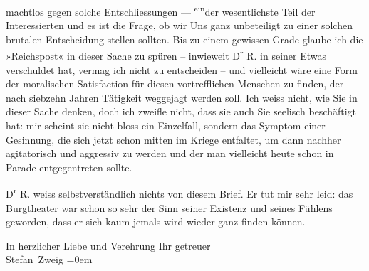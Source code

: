                machtlos gegen solche Entschliessungen — \substVorne{}\textsuperscript{ein}\substDazwischen{}der\substHinten{} wesentlichste Teil der Interessierten und es ist die Frage, ob wir Uns ganz
               unbeteiligt zu einer solchen brutalen Entscheidung stellen sollten. Bis zu einem
               gewissen Grade glaube ich die »Reichspost« in
               dieser Sache zu spüren – inwieweit D\textsuperscript{r}{ }R. in seiner \label{K_L03653-3v}\label{K_L03653-3} Etwas
               verschuldet hat, vermag ich nicht zu entscheiden – und vielleicht wäre eine Form der
               moralischen Satisfaction für diesen vortrefflichen {\pb}Menschen zu finden, der nach siebzehn
               Jahren Tätigkeit \label{K_L03653-4v}\label{K_L03653-4}
               weggejagt werden soll. Ich weiss nicht, wie Sie in dieser Sache denken, doch ich
               zweifle nicht, dass sie auch Sie seelisch beschäftigt hat: mir scheint sie nicht
               bloss ein Einzelfall, sondern das Symptom einer Gesinnung, die sich jetzt schon
               mitten im Kriege entfaltet, um dann nachher agitatorisch und aggressiv zu werden und
               der man vielleicht heute schon in Parade entgegentreten sollte.\pend
           
\pstart
           D\textsuperscript{r}{ }R. weiss selbstverständlich nichts von diesem
               Brief. Er tut mir sehr leid: das Burgtheater war
               schon so sehr der Sinn seiner Existenz und seines Fühlens geworden, dass er sich kaum
               jemals wird wieder ganz finden können.\pend
           
\pstart
           In herzlicher Liebe und Verehrung Ihr getreuer{\\[\baselineskip]}\spacefill\mbox{Stefan Zweig}\pend
           \leftskip=0em{}\endnumbering{}  \newcommand{\dateiname}{L03653}\newcommand{\titel}{Stefan Zweig an Arthur Schnitzler, [zwischen 7. 4. 1915 und 9. 4. 1915?]}\newcommand{\editorInnen}{Selma Jahnke und Martin Anton Müller}
